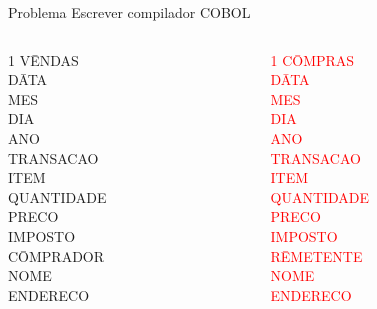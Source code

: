 \begin{frame}{Problema}
Escrever compilador COBOL
\begin{columns}
\begin{column}{0.5\textwidth}
\begin{tabbing}
1 V\=ENDAS\\
   D\=ATA \\
    \> MES \\
    \> DIA \\
    \> ANO \\
   TRANSACAO \\  
    \> ITEM \\
    \> QUANTIDADE \\
    \> PRECO\\
    \> IMPOSTO\\
    \> C\=OMPRADOR\\
    \>\> NOME \\
    \>\> ENDERECO \\
\end{tabbing}
\end{column}

\begin{column}{0.5\textwidth}
\textcolor{red}{
\begin{tabbing}
1 C\=OMPRAS\\
   D\=ATA \\
    \> MES \\
    \> DIA \\
    \> ANO \\
   TRANSACAO \\  
    \> ITEM \\
    \> QUANTIDADE \\
    \> PRECO\\
    \> IMPOSTO\\
    \> R\=EMETENTE\\
    \>\> NOME \\
    \>\> ENDERECO \\
\end{tabbing}
}
\end{column}
\end{columns}
\end{frame}



